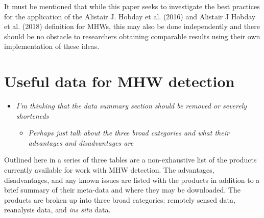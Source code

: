 \documentclass[]{article}
\providecommand{\tightlist}{%
  \setlength{\itemsep}{0pt}\setlength{\parskip}{0pt}}
\begin{document}
It must be mentioned that while this paper seeks to investigate the best
practices for the application of the Alistair J. Hobday et al. (2016)
and Alistair J Hobday et al. (2018) definition for MHWs, this may also
be done independently and there should be no obstacle to researchers
obtaining comparable results using their own implementation of these
ideas.

\section{Useful data for MHW
detection}\label{useful-data-for-mhw-detection}

\begin{itemize}
\tightlist
\item
  \emph{I'm thinking that the data summary section should be removed or
  severely shorteneds}

  \begin{itemize}
  \tightlist
  \item
    \emph{Perhaps just talk about the three broad categories and what
    their advantages and disadvantages are}
  \end{itemize}
\end{itemize}

Outlined here in a series of three tables are a non-exhaustive list of
the products currently available for work with MHW detection. The
advantages, disadvantages, and any known issues are listed with the
products in addition to a brief summary of their meta-data and where
they may be downloaded. The products are broken up into three broad
categories: remotely sensed data, reanalysis data, and \emph{ins situ}
data.
\end{document}
